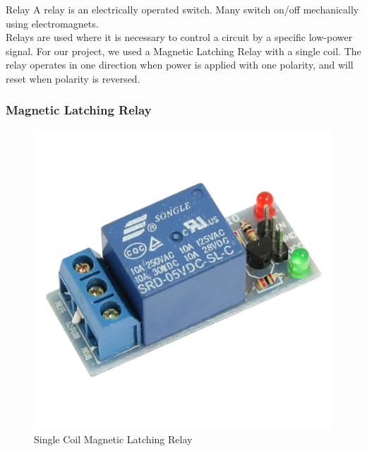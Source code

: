 \documentclass[10pt]{beamer}
\begin{document}
{
	\begin{frame}{Relay}
		A relay is an electrically operated switch. Many switch on/off mechanically using electromagnets.   \\
		\vspace{5mm}
		Relays are used where it is necessary to control a circuit by a specific low-power signal. For our project, we used a Magnetic Latching Relay with a single coil. The relay operates in one direction when power is applied with one polarity, and will reset when polarity is reversed. 
	\end{frame}
}
{
	\begin{frame}
		\frametitle{Magnetic Latching Relay}
		\begin{figure}
			\begin{minipage}[b]{0.4\linewidth}
				\includegraphics[width = 0.8\linewidth]{images/relay}
				\caption{Single Coil Magnetic Latching Relay}
			\end{minipage}
			\begin{minipage}[b]{0.4\linewidth}

\end{minipage}
\end{figure}
\end{frame}}
\end{document}

